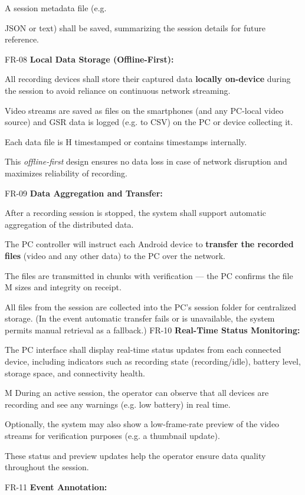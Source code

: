 A session metadata file (e.g.

JSON or text) shall be saved, summarizing the session details for future reference.

FR-08 \textbf{Local Data Storage (Offline-First):}

All recording devices shall store their captured data \textbf{locally on-device}
 during the session to avoid reliance on continuous network streaming.

Video streams are saved as files on the smartphones (and any PC-local video source) and GSR data is logged (e.g. to CSV) on the PC or device collecting it.

Each data file is H timestamped or contains timestamps internally.

This \textit{offline-first} design ensures no data loss in case of network disruption and maximizes reliability of recording.

FR-09 \textbf{Data Aggregation and Transfer:}

After a recording session is stopped, the system shall support automatic aggregation of the distributed data.

The PC controller will instruct each Android device to \textbf{transfer the recorded files}
 (video and any other data) to the PC over the network.

The files are transmitted in chunks with verification --- the PC confirms the file M sizes and integrity on receipt.

All files from the session are collected into the PC's session folder for centralized storage. (In the event automatic transfer fails or is unavailable, the system permits manual retrieval as a fallback.) FR-10 \textbf{Real-Time Status Monitoring:}

The PC interface shall display real-time status updates from each connected device, including indicators such as recording state (recording/idle), battery level, storage space, and connectivity health.

M During an active session, the operator can observe that all devices are recording and see any warnings (e.g. low battery) in real time.

Optionally, the system may also show a low-frame-rate preview of the video streams for verification purposes (e.g. a thumbnail update).

These status and preview updates help the operator ensure data quality throughout the session.

FR-11 \textbf{Event Annotation:}

